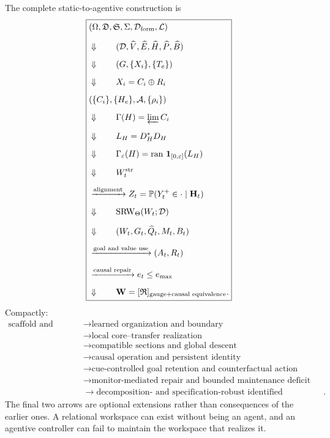 \documentclass[11pt,letterpaper]{article}
\newcommand{\Workspace}{\mathbf W}
\newcommand{\SRW}{\operatorname{SRW}}
\DeclareMathOperator{\ran}{ran}
\theoremstyle{plain}
\theoremstyle{definition}
\begin{document}
The complete static-to-agentive construction is
\[
\boxed{
\begin{aligned}
&
(\Omega,\mathfrak D,\mathfrak S,\Sigma,\mathcal D_{\mathrm{form}},\mathcal L)
\\[2mm]
&\Downarrow
\qquad
(\mathcal D,\widehat V,\widehat E,\widehat H,\widehat P,\widehat B)
\\[2mm]
&\Downarrow
\qquad
(G,\{X_i\},\{T_e\})
\\[2mm]
&\Downarrow
\qquad
X_i=C_i\oplus R_i
\\[2mm]
&
(\{C_i\},\{H_e\},\mathcal A,\{\rho_i\})
\\[2mm]
&\Downarrow
\qquad
\Gamma(H)=\varprojlim C_i
\\[2mm]
&\Downarrow
\qquad
L_H=D_H^*D_H
\\[2mm]
&\Downarrow
\qquad
\Gamma_\varepsilon(H)
=
\ran\,\mathbf 1_{[0,\varepsilon]}(L_H)
\\[2mm]
&\Downarrow
\qquad
W_t^{\mathrm{str}}
\\[2mm]
&\xrightarrow{\text{alignment}}
Z_t=\mathbb P(Y_t^+\in\cdot\mid\mathbf H_t)
\\[2mm]
&\Downarrow
\qquad
\SRW_\Theta(W_t;\mathcal D)
\\[2mm]
&\Downarrow
\qquad
(W_t,G_t,\widehat Q_t,M_t,B_t)
\\[2mm]
&\xrightarrow{\text{goal and value use}}
(A_t,R_t)
\\[2mm]
&\xrightarrow{\text{causal repair}}
e_t\leq e_{\max}
\\[2mm]
&\Downarrow
\qquad
\Workspace
=
[\mathfrak R]_{\text{gauge}+\text{causal equivalence}}.
\end{aligned}
}
\]
Compactly:
\[
\boxed{
\begin{aligned}
\text{scaffold and history}
&\to
\text{learned organization and boundary}
\\
&\to
\text{local core--transfer realization}
\\
&\to
\text{compatible sections and global descent}
\\
&\to
\text{causal operation and persistent identity}
\\
&\to
\text{cue-controlled goal retention and counterfactual action}
\\
&\to
\text{monitor-mediated repair and bounded maintenance deficit}
\\
&\to
\text{decomposition- and specification-robust identified certification}.
\end{aligned}
}
\]
The final two arrows are optional extensions rather than consequences of the
earlier ones. A relational workspace can exist without being an agent, and an
agentive controller can fail to maintain the workspace that realizes it.
\end{document}
